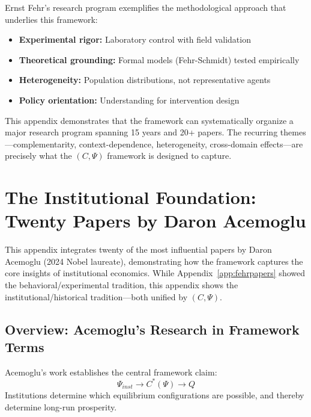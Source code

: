 \documentclass[12pt,a4paper]{article}
\begin{document}
Ernst Fehr's research program exemplifies the methodological approach
that underlies this framework:
\begin{itemize}
  \item \textbf{Experimental rigor:} Laboratory control with field validation
  \item \textbf{Theoretical grounding:} Formal models (Fehr-Schmidt) tested empirically
  \item \textbf{Heterogeneity:} Population distributions, not representative agents
  \item \textbf{Policy orientation:} Understanding for intervention design
\end{itemize}

This appendix demonstrates that the framework can systematically organize
a major research program spanning 15 years and 20+ papers. The recurring
themes---complementarity, context-dependence, heterogeneity, cross-domain
effects---are precisely what the $(C, \Psi)$ framework is designed to capture.

\section{The Institutional Foundation: Twenty Papers by Daron Acemoglu}
\label{app:acemoglu}

This appendix integrates twenty of the most influential papers by Daron Acemoglu
(2024 Nobel laureate), demonstrating how the framework captures the core
insights of institutional economics. While Appendix~\ref{app:fehrpapers}
showed the behavioral/experimental tradition, this appendix shows the
institutional/historical tradition---both unified by $(C, \Psi)$.

\subsection{Overview: Acemoglu's Research in Framework Terms}

Acemoglu's work establishes the central framework claim:
\begin{equation}
  \Psi_{inst} \to C^*(\Psi) \to Q
\end{equation}
Institutions determine which equilibrium configurations are possible,
and thereby determine long-run prosperity.
\end{document}
